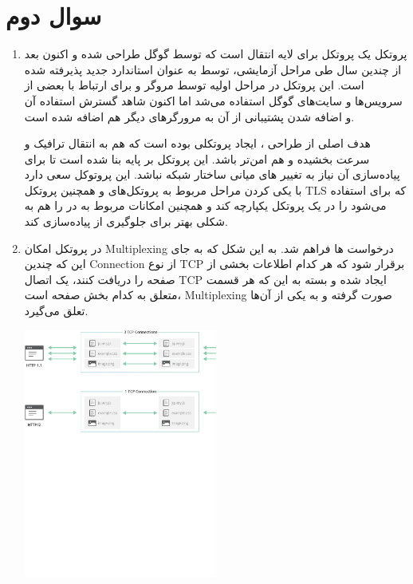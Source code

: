 \documentclass[12pt]{article}
\begin{document}
\section{سوال دوم}

\begin{enumerate}
	\item 
	پروتکل  یک پروتکل برای لایه انتقال است که توسط گوگل طراحی شده و  اکنون بعد از چندین سال طی مراحل آزمایشی، توسط  به عنوان استاندارد جدید پذیرفته شده است. این پروتکل در مراحل اولیه توسط مروگر  و برای ارتباط با بعضی از سرویس‌ها و سایت‌های گوگل استفاده می‌شد اما اکنون شاهد گسترش استفاده آن و اضافه شدن پشتیبانی از آن به مرورگرهای دیگر هم اضافه شده است.
	
	هدف اصلی از طراحی ، ایجاد پروتکلی بوده است که هم به انتقال ترافیک  و  سرعت بخشیده و هم امن‌تر باشد. این پروتکل بر پایه  بنا شده است تا برای پیاده‌سازی آن نیاز به تغییر  های میانی ساختار شبکه نباشد. این پروتوکل سعی دارد با یکی کردن مراحل مربوط به  پروتکل‌های  و همچنین پروتکل TLS که برای  استفاده می‌شود را در یک پروتکل یکپارچه کند و همچنین امکانات مربوط به  در  را هم به شکلی بهتر برای جلوگیری از  پیاده‌سازی کند.
	
	\item
	
	در پروتکل  امکان Multiplexing درخواست ها فراهم شد. به این شکل که به جای این که چندین Connection از نوع TCP برقرار شود که هر کدام اطلاعات بخشی از صفحه را دریافت کنند، یک اتصال TCP ایجاد شده و بسته به این که هر قسمت متعلق به کدام بخش صفحه است، Multiplexing صورت گرفته و به یکی از آن‌ها تعلق می‌گیرد.
	
	\begin{center}
		
		\includegraphics[width = 0.5\textwidth , trim=0 450 0 0]{images/multiplexing.pdf}
	\end{center}
	

\end{enumerate}
\end{document}
